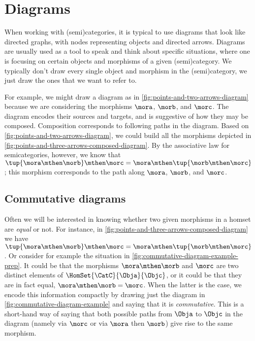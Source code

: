 
\section{Diagrams}

When working with (semi)categories, it is typical to use diagrams that look like directed graphs, with nodes representing objects and directed arrows.
Diagrams are usually used as a tool to speak and think about specific situations, where one is focusing on certain objects and morphisms of a given (semi)category.
We typically don't draw every single object and morphism in the (semi)category, we just draw the ones that we want to refer to.

\begin{marginfigure}
	\centering
	\caption{}
	\label{fig:points-and-three-arrows-diagram}
\end{marginfigure}

\begin{marginfigure}
	\centering
	\caption{}
	\label{fig:points-and-three-arrows-composed-diagram}
\end{marginfigure}

For example, we might draw a diagram as in \cref{fig:points-and-two-arrows-diagram} because we are considering the morphisms $\mora$, $\morb$, and $\morc$.
The diagram encodes their sources and targets, and is suggestive of how they may be composed.
Composition corresponds to following paths in the diagram.
Based on \cref{fig:points-and-two-arrows-diagram}, we could build all the morphisms depicted in \cref{fig:points-and-three-arrows-composed-diagram}.
By the associative law for semicategories, however, we know that $\tup{\mora \mthen \morb} \mthen \morc = \mora \mthen \tup{\morb \mthen \morc}$; this morphism corresponds to the path along $\mora$, $\morb$, and $\morc$.

\subsection{Commutative diagrams}

Often we will be interested in knowing whether two given morphisms in a homset are \emph{equal} or not.
For instance, in \cref{fig:points-and-three-arrows-composed-diagram} we have $\tup{\mora \mthen \morb} \mthen \morc = \mora \mthen \tup{\morb \mthen \morc}$.
Or consider for example the situation in \cref{fig:commutative-diagram-example-prep}.
It could be that the morphisms $\mora \mthen \morb$ and $\morc$ are two distinct elements of $\HomSet{\CatC}{\Obja}{\Objc}$, or it could be that they are in fact equal,  $\mora \mthen \morb = \morc$.
When the latter is the case, we encode this information compactly by drawing just the diagram in \cref{fig:commutative-diagram-example} and saying that it is \emph{commutative}.
This is a short-hand way of saying that both possible paths from $\Obja$ to $\Objc$ in the diagram (namely via $\morc$ or via $\mora$ then $\morb$) give rise to the same morphism.

